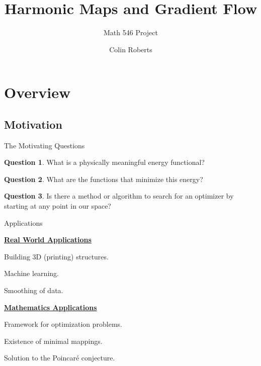 \documentclass[usenames,dvipsnames]{beamer}
\title{Harmonic Maps and Gradient Flow}
\subtitle{Math 546 Project}
\author{Colin Roberts}
\theoremstyle{definition}
\newtheorem*{question}{Question}
\theoremstyle{theorem}
\begin{document}
{
\begin{frame}
\titlepage
\end{frame}
}



\section{Overview}
    
    \subsection{Motivation}
        
        \begin{frame}{The Motivating Questions}
            \begin{question}
            What is a physically meaningful energy functional?
            \end{question}
            
            \begin{question}
            What are the functions that minimize this energy?
            \end{question}
            
            \begin{question}
            Is there a method or algorithm to search for an optimizer by starting at any point in our space?
            \end{question}
        \end{frame}
        
    \begin{frame}{Applications}
    \begin{itemize}
    \begin{minipage}{0.45\linewidth}
    \item[] \textbf{\underline{Real World Applications}}
    \item Building 3D (printing) structures.
    \item Machine learning.
    \item Smoothing of data.
\end{minipage}
\begin{minipage}{0.5\linewidth}
    \item[] \textbf{\underline{Mathematics Applications}}
    \item Framework for optimization problems.
    \item Existence of minimal mappings.
    \item Solution to the Poincar\'e conjecture.
\end{minipage}
    \end{itemize}
    \end{frame}
\end{document}
